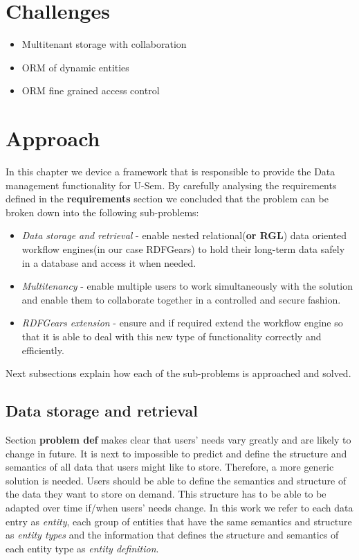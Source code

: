\documentclass[a4paper, notitlepage]{article}
\begin{document}
\section{Challenges}

\begin{itemize}
	\item Multitenant storage with collaboration
	\item ORM of dynamic entities
	\item ORM fine grained access control
\end{itemize}

\section{Approach}
In this chapter we device a framework that is responsible to provide the Data management functionality for U-Sem. By carefully analysing the requirements defined in the \textbf{requirements} section we concluded that the problem can be broken down into the following sub-problems:
\begin{itemize}
	\item \textit{Data storage and retrieval} - enable nested relational(\textbf{or RGL}) data oriented workflow engines(in our case RDFGears) to hold their long-term data safely in a database and access it when needed.
	\item \textit{Multitenancy} - enable multiple users to work simultaneously with the solution and enable them to collaborate together in a controlled and secure fashion.
	\item \textit{RDFGears extension} - ensure and if required extend the workflow engine so that it is able to deal with this new type of functionality correctly and efficiently.
\end{itemize}

Next subsections explain how each of the sub-problems is approached and solved.

\subsection{Data storage and retrieval}

Section \textbf{problem def} makes clear that users' needs vary greatly and are likely to change in future. It is next to impossible to predict and define the structure and semantics of all data that users might like to store. Therefore, a more generic solution is needed. Users should be able to define the semantics and structure of the data they want to store on demand. This structure has to be able to be adapted over time if/when users' needs change. In this work we refer to each data entry as \textit{entity}, each group of entities that have the same semantics and structure as \textit{entity types} and the information that defines the structure and semantics of each entity type as \textit{entity definition}.
\end{document}
